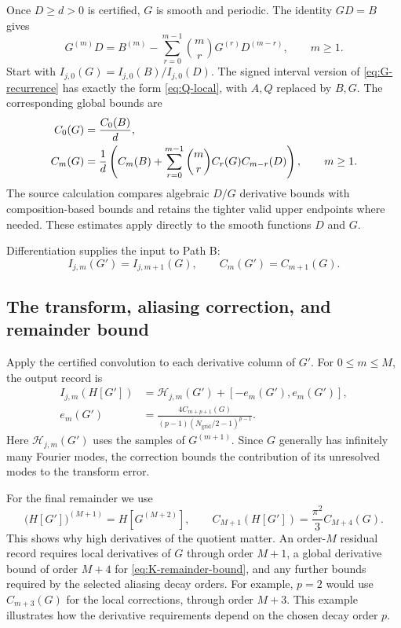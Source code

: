 \documentclass[11pt]{article}
\numberwithin{equation}{section}
\newcommand{\Ngrid}{N_{\mathrm{grid}}}
\begin{document}
Once $D\geq d>0$ is certified, $G$ is smooth and periodic. The identity
$GD=B$ gives
\begin{equation}
 G^{(m)}D=B^{(m)}-
 \sum_{r=0}^{m-1}\binom mr G^{(r)}D^{(m-r)},\qquad m\geq1.
 \label{eq:G-recurrence}
\end{equation}
Start with $I_{j,0}(G)=I_{j,0}(B)/I_{j,0}(D)$. The signed interval version
of \eqref{eq:G-recurrence} has exactly the form \eqref{eq:Q-local}, with
$A,Q$ replaced by $B,G$. The corresponding global bounds are
\begin{align}
 C_0(G)&=\frac{C_0(B)}{d},\notag\\
 C_m(G)&=\frac{1}{d}\left(
 C_m(B)+\sum_{r=0}^{m-1}\binom mr C_r(G)C_{m-r}(D)\right),
 \qquad m\geq1.
 \label{eq:G-bound}
\end{align}
The source calculation compares algebraic $D/G$ derivative bounds with
composition-based bounds and retains the tighter valid upper endpoints
where needed. These estimates apply directly to the smooth functions
$D$ and $G$.

Differentiation supplies the input to Path B:
\begin{equation}
 I_{j,m}(G')=I_{j,m+1}(G),\qquad C_m(G')=C_{m+1}(G).
 \label{eq:Gprime}
\end{equation}

\subsection{The transform, aliasing correction, and remainder bound}

Apply the certified convolution to each derivative column of $G'$. For
$0\leq m\leq M$, the output record is
\begin{equation}
 \boxed{\begin{aligned}
 I_{j,m}(H[G'])&=\mathcal H_{j,m}(G')+[-e_m(G'),e_m(G')],\\
 e_m(G')&=\frac{4C_{m+p+1}(G)}{(p-1)(\Ngrid/2-1)^{p-1}}.
 \end{aligned}}
 \label{eq:K-local}
\end{equation}
Here $\mathcal H_{j,m}(G')$ uses the samples of $G^{(m+1)}$. Since $G$
generally has infinitely many Fourier modes, the correction bounds the
contribution of its unresolved modes to the transform error.

For the final remainder we use
\begin{equation}
 \bigl(H[G']\bigr)^{(M+1)}=H[G^{(M+2)}],\qquad
 \boxed{C_{M+1}(H[G'])=\frac{\pi^2}{3}C_{M+4}(G).}
 \label{eq:K-remainder-bound}
\end{equation}
This shows why high derivatives of the quotient matter. An order-$M$
residual record requires local derivatives of $G$ through order $M+1$,
a global derivative bound of order $M+4$ for \eqref{eq:K-remainder-bound}, and any further
bounds required by the selected aliasing decay orders. For example,
$p=2$ would use $C_{m+3}(G)$ for the local corrections, through order
$M+3$. This example illustrates how the derivative requirements depend
on the chosen decay order $p$.
\end{document}
